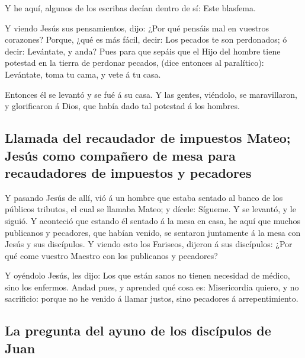  Y he aquí, algunos de los escribas decían dentro de sí:
Este blasfema.

 Y viendo Jesús sus pensamientos, dijo: ¿Por qué pensáis mal
en vuestros corazones?  Porque, ¿qué es más fácil, decir:
Los pecados te son perdonados; ó decir: Levántate, y anda? 
Pues para que sepáis que el Hijo del hombre tiene potestad en la tierra
de perdonar pecados, (dice entonces al paralítico): Levántate, toma tu
cama, y vete á tu casa.

 Entonces él se levantó y se fué á su casa.  Y
las gentes, viéndolo, se maravillaron, y glorificaron á Dios, que había
dado tal potestad á los hombres.

\hypertarget{llamada-del-recaudador-de-impuestos-mateo-jesuxfas-como-compauxf1ero-de-mesa-para-recaudadores-de-impuestos-y-pecadores}{%
\subsection{Llamada del recaudador de impuestos Mateo; Jesús como
compañero de mesa para recaudadores de impuestos y
pecadores}\label{llamada-del-recaudador-de-impuestos-mateo-jesuxfas-como-compauxf1ero-de-mesa-para-recaudadores-de-impuestos-y-pecadores}}

 Y pasando Jesús de allí, vió á un hombre que estaba sentado
al banco de los públicos tributos, el cual se llamaba Mateo; y dícele:
Sígueme. Y se levantó, y le siguió.  Y aconteció que
estando él sentado á la mesa en casa, he aquí que muchos publicanos y
pecadores, que habían venido, se sentaron juntamente á la mesa con Jesús
y sus discípulos.  Y viendo esto los Fariseos, dijeron á
sus discípulos: ¿Por qué come vuestro Maestro con los publicanos y
pecadores?

 Y oyéndolo Jesús, les dijo: Los que están sanos no tienen
necesidad de médico, sino los enfermos.  Andad pues, y
aprended qué cosa es: Misericordia quiero, y no sacrificio: porque no he
venido á llamar justos, sino pecadores á arrepentimiento.

\hypertarget{la-pregunta-del-ayuno-de-los-discuxedpulos-de-juan}{%
\subsection{La pregunta del ayuno de los discípulos de
Juan}\label{la-pregunta-del-ayuno-de-los-discuxedpulos-de-juan}}

